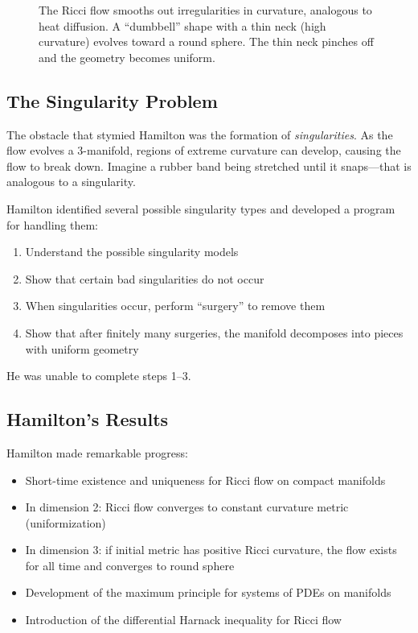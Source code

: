 \begin{figure}[htbp]
\caption{The Ricci flow smooths out irregularities in curvature, analogous to heat diffusion. A ``dumbbell'' shape with a thin neck (high curvature) evolves toward a round sphere. The thin neck pinches off and the geometry becomes uniform.}
\label{fig:ricci_flow_dumbbell}
\end{figure}

\subsection{The Singularity Problem}

The obstacle that stymied Hamilton was the formation of \textit{singularities}. As the flow evolves a 3-manifold, regions of extreme curvature can develop, causing the flow to break down. Imagine a rubber band being stretched until it snaps---that is analogous to a singularity.

Hamilton identified several possible singularity types and developed a program for handling them:
\begin{enumerate}
  \item Understand the possible singularity models
  \item Show that certain bad singularities do not occur
  \item When singularities occur, perform ``surgery'' to remove them
  \item Show that after finitely many surgeries, the manifold decomposes into pieces with uniform geometry
\end{enumerate}

He was unable to complete steps 1--3.

\subsection{Hamilton's Results}

Hamilton made remarkable progress:
\begin{itemize}
  \item Short-time existence and uniqueness for Ricci flow on compact manifolds
  \item In dimension 2: Ricci flow converges to constant curvature metric (uniformization)
  \item In dimension 3: if initial metric has positive Ricci curvature, the flow exists for all time and converges to round sphere
  \item Development of the maximum principle for systems of PDEs on manifolds
  \item Introduction of the differential Harnack inequality for Ricci flow
\end{itemize}

